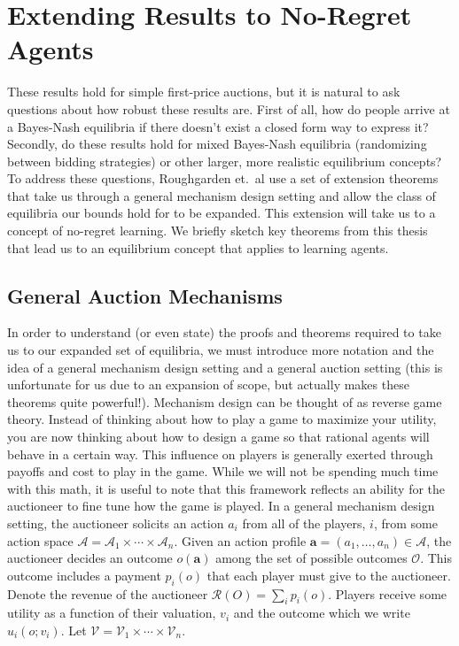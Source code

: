 \documentclass[12pt,twoside]{reedthesis}
\begin{document}
\section{Extending Results to No-Regret Agents}
These results hold for simple first-price auctions, but it is natural to ask questions about how robust these results are. First of all, how do people arrive at a Bayes-Nash equilibria if there doesn't exist a closed form way to express it? Secondly, do these results hold for mixed Bayes-Nash equilibria (randomizing between bidding strategies) or other larger, more realistic equilibrium concepts? To address these questions, Roughgarden et.~al use a set of extension theorems that take us through a general mechanism design setting and allow the class of equilibria our bounds hold for to be expanded. This extension will take us to a concept of no-regret learning. We briefly sketch key theorems from this thesis that lead us to an equilibrium concept that applies to learning agents.

\subsection{General Auction Mechanisms}

In order to understand (or even state) the proofs and theorems required to take us to our expanded set of equilibria, we must introduce  more notation and the idea of a general mechanism design setting and a general auction setting (this is unfortunate for us due to an expansion of scope, but actually makes these theorems quite powerful!). Mechanism design can be thought of as reverse game theory. Instead of thinking about how to play a game to maximize your utility, you are now thinking about how to design a game so that rational agents will behave in a certain way. This influence on players is generally exerted through payoffs and cost to play in the game. While we will not be spending much time with this math, it is useful to note that this framework reflects an ability for the auctioneer to fine tune how the game is played. In a general mechanism design setting, the auctioneer solicits an action $a_i$ from all of the players, $i$, from some action space $\mathcal{A} = \mathcal{A}_1 \times \cdots \times \mathcal{A}_n$. Given an action profile $\textbf{a} = (a_1, \dots, a_n) \in \mathcal{A}$, the auctioneer decides an outcome $o(\textbf{a})$ among the set of possible outcomes $\mathcal{O}$. This outcome includes a payment $p_i(o)$ that each player must give to the auctioneer. Denote the revenue of the auctioneer $\mathcal{R}(O) = \sum_i p_i(o)$. Players receive some utility as a function of their valuation, $v_i$ and the outcome which we write $u_i(o;v_i)$. Let $\mathcal{V} = \mathcal{V}_1 \times \cdots \times \mathcal{V}_n$. 
\end{document}
